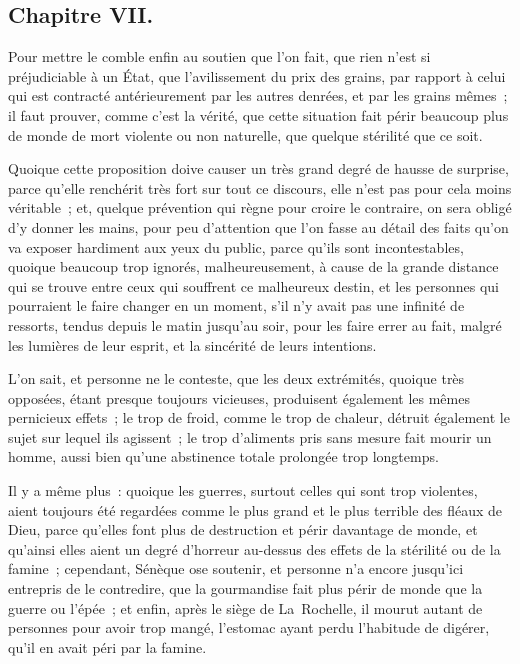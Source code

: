 \documentclass[french,twoside]{book} %
\begin{document}
\subsection[{Chapitre VII.}]{Chapitre VII.}
\noindent Pour mettre le comble enfin au soutien que l’on fait, que rien n’est si préjudiciable à un État, que l’avilissement du prix des grains, par rapport à celui qui est contracté antérieurement par les autres denrées, et par les grains mêmes ; il faut prouver, comme c’est la vérité, que cette situation fait périr beaucoup plus de monde de mort violente ou non naturelle, que quelque stérilité que ce soit.\par
Quoique cette proposition doive causer un très grand degré de hausse de surprise, parce qu’elle renchérit très fort sur tout ce discours, elle n’est pas pour cela moins véritable ; et, quelque prévention qui règne pour croire le contraire, on sera obligé d’y donner les mains, pour peu d’attention que l’on fasse au détail des faits qu’on va exposer hardiment aux yeux du public, parce qu’ils sont incontestables, quoique beaucoup trop ignorés, malheureusement, à cause de la grande distance qui se trouve entre ceux qui souffrent ce malheureux destin, et les personnes qui pourraient le faire changer en un moment, s’il n’y avait pas une infinité de ressorts, tendus depuis le matin jusqu’au soir, pour les faire errer au fait, malgré les lumières de leur esprit, et la sincérité de leurs intentions.\par
L’on sait, et personne ne le conteste, que les deux extrémités, quoique très opposées, étant presque toujours vicieuses, produisent également les mêmes pernicieux effets ; le trop de froid, comme le trop de chaleur, détruit également le sujet sur lequel ils agissent ; le trop d’aliments pris sans mesure fait mourir un homme, aussi bien qu’une abstinence totale prolongée trop longtemps.\par
Il y a même plus : quoique les guerres, surtout celles qui sont trop violentes, aient toujours été regardées comme le plus grand et le plus terrible des fléaux de Dieu, parce qu’elles font plus de destruction et périr davantage de monde, et qu’ainsi elles aient un degré d’horreur au-dessus des effets de la stérilité ou de la famine ; cependant, Sénèque ose soutenir, et personne n’a encore jusqu’ici entrepris de le contredire, que la gourmandise fait plus périr de monde que la guerre ou l’épée ; et enfin, après le siège de La Rochelle, il mourut autant de personnes pour avoir trop mangé, l’estomac ayant perdu l’habitude de digérer, qu’il en avait péri par la famine.\par
\end{document}
